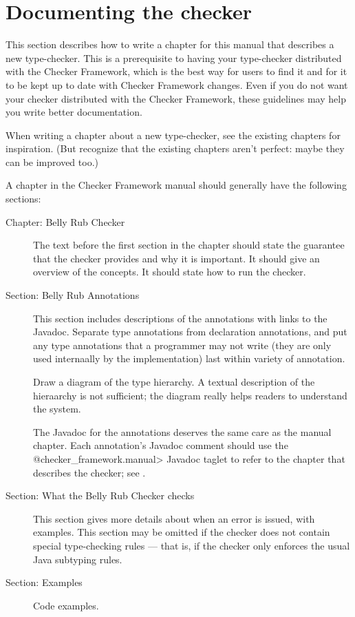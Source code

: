 \section{Documenting the checker\label{documenting-a-checker}}

This section describes how to write a chapter for this manual that
describes a new type-checker.  This is a prerequisite to having your
type-checker distributed with the Checker Framework, which is the best way
for users to find it and for it to be kept up to date with Checker
Framework changes.  Even if you do not want your checker distributed with
the Checker Framework, these guidelines may help you write better
documentation.

When writing a chapter about a new type-checker, see the existing chapters
for inspiration.  (But recognize that the existing chapters aren't perfect:
maybe they can be improved too.)

A chapter in the Checker Framework manual should generally have the
following sections:

\begin{description}
\item[Chapter: Belly Rub Checker]
  The text before the first section in the chapter should state the
  guarantee that the checker provides and why it is important.  It should
  give an overview of the concepts.  It should state how to run the checker.
\item[Section: Belly Rub Annotations]
  This section includes descriptions of the annotations with links to the
  Javadoc.  Separate type annotations from declaration annotations, and put
  any type annotations that a programmer may not write (they are only used
  internaally by the implementation) last within variety of annotation.

  Draw a diagram of the type hierarchy.  A textual description of
  the hieraarchy is not sufficient; the diagram really helps readers to
  understand the system.

  The Javadoc for the annotations deserves the same care as the manual
  chapter.  Each annotation's Javadoc comment should use the
  \<@checker\_framework.manual> Javadoc taglet to refer to the chapter that
  describes the checker; see .
\item[Section: What the Belly Rub Checker checks]
  This section gives more details about when an error is issued, with examples.
  This section may be omitted if the checker does not contain special
  type-checking rules --- that is, if the checker only enforces the usual
  Java subtyping rules.
\item[Section: Examples]
  Code examples.
\end{description}


